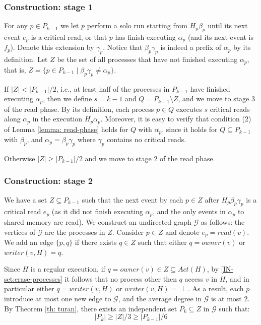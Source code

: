 \subsubsection{Construction: stage 1}
For any $p \in P_{k-1}$ we let $p$ perform a solo run starting from $H_p \beta_p$ until its next event $e_p$ is a critical read, or that $p$ has finish executing $\alpha_p$ (and its next event is $f_p$). Denote this extension by $\gamma_p$. Notice that $\beta_p \gamma_p$ is indeed a prefix of $\alpha_p$ by its definition.
Let $Z$ be the set of all processes that have not finished executing $\alpha_p$, that is, $Z = \{p \in P_{k-1} \mid \beta_p \gamma_p \neq \alpha_p\}$.

If $|Z|<|P_{k-1}|/2$, i.e., at least half of the processes in $P_{k-1}$ have finished executing $\alpha_p$, then we define $s=k-1$ and $Q = P_{k-1} \setminus Z$, and we move to stage 3 of the read phase.
By its definition, each process $p \in Q$ executes $s$ critical reads along $\alpha_p$ in the execution $H_p \alpha_p$. Moreover, it is easy to verify that condition (2) of Lemma \ref{lemma: read-phase} holds for $Q$ with $\alpha_p$, since it holds for $Q \subseteq P_{k-1}$ with $\beta_p$, and $\alpha_p = \beta_p \gamma_p$ where $\gamma_p$ contains no critical reads.

Otherwise $|Z| \geq |P_{k-1}|/2$ and we move to stage 2 of the read phase.


\subsubsection{Construction: stage 2}

We have a set $Z \subseteq P_{k-1}$ such that the next event by each $p \in Z$ after $H_p \beta_p \gamma_p$ is a critical read $e_p$ (as it did not finish executing $\alpha_p$, and the only events in $\alpha_p$ to shared memory are read).
We construct an undirected graph $\mathcal{G}$ as follows: the vertices of $\mathcal{G}$ are the processes in $Z$. Consider $p \in Z$ and denote $e_p = read(v)$. We add an edge $\{p,q\}$ if there exists $q \in Z$ such that either $q = owner(v)$ or $writer(v, H) = q$.

Since $H$ is a regular execution, if $q = owner(v) \in Z \subseteq Act(H)$, by \ref{IN-set:erase-processes} it follows that no process other then $q$ access $v$ in $H$, and in particular either $q = writer(v,H)$ or $writer(v,H) = \perp$.
As a result, each $p$ introduce at most one new edge to $\mathcal{G}$, and the average degree in $\mathcal{G}$ is at most 2. By Theorem \ref{th: turan}, there exists an independent set $P_k \subseteq Z$ in $\mathcal{G}$ such that:
$$|P_k| \geq |Z|/3 \geq |P_{k-1}|/6$$

